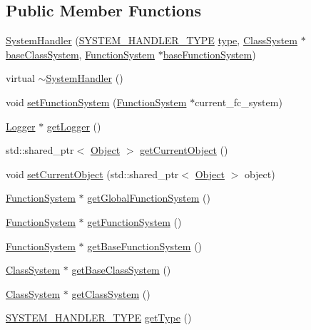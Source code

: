 \subsection*{Public Member Functions}
\begin{DoxyCompactItemize}
\item 
\hyperlink{classSystemHandler_abda0d6c76ea3eb8fa8e1493931e5d76b}{System\+Handler} (\hyperlink{statics_8h_a28f867553077bc713fdf8921a9226e2e}{S\+Y\+S\+T\+E\+M\+\_\+\+H\+A\+N\+D\+L\+E\+R\+\_\+\+T\+Y\+PE} \hyperlink{classSystemHandler_a8ca6090af683e8555051681fd31cd865}{type}, \hyperlink{classClassSystem}{Class\+System} $\ast$\hyperlink{classSystemHandler_ab54036ced60be518459b1c4753667912}{base\+Class\+System}, \hyperlink{classFunctionSystem}{Function\+System} $\ast$\hyperlink{classSystemHandler_af601707ec9f56e24be4c0541a1c760f4}{base\+Function\+System})
\item 
virtual \hyperlink{classSystemHandler_afd4662824fbf97d8feb248c346968102}{$\sim$\+System\+Handler} ()
\item 
void \hyperlink{classSystemHandler_af27b9410a75ac02dff13b045afdff038}{set\+Function\+System} (\hyperlink{classFunctionSystem}{Function\+System} $\ast$current\+\_\+fc\+\_\+system)
\item 
\hyperlink{classLogger}{Logger} $\ast$ \hyperlink{classSystemHandler_a2d30e2dd0efb6287ae14b36f1c6bb48b}{get\+Logger} ()
\item 
std\+::shared\+\_\+ptr$<$ \hyperlink{classObject}{Object} $>$ \hyperlink{classSystemHandler_aa2a7dad9232938a79b8a813b1238ee13}{get\+Current\+Object} ()
\item 
void \hyperlink{classSystemHandler_a2954779b7877d67d7207c4ea27194a0c}{set\+Current\+Object} (std\+::shared\+\_\+ptr$<$ \hyperlink{classObject}{Object} $>$ object)
\item 
\hyperlink{classFunctionSystem}{Function\+System} $\ast$ \hyperlink{classSystemHandler_a6622a7fa3c494ec657448d0d3f01eb3b}{get\+Global\+Function\+System} ()
\item 
\hyperlink{classFunctionSystem}{Function\+System} $\ast$ \hyperlink{classSystemHandler_a052dfd8bfff27ed9bf12fd84e066ecb3}{get\+Function\+System} ()
\item 
\hyperlink{classFunctionSystem}{Function\+System} $\ast$ \hyperlink{classSystemHandler_a2013db1f8788be4d7e3eb1da5320de45}{get\+Base\+Function\+System} ()
\item 
\hyperlink{classClassSystem}{Class\+System} $\ast$ \hyperlink{classSystemHandler_a2127b2f17952d52c457d40baa641b009}{get\+Base\+Class\+System} ()
\item 
\hyperlink{classClassSystem}{Class\+System} $\ast$ \hyperlink{classSystemHandler_a218066abe52952bf45c3ba21fdf86368}{get\+Class\+System} ()
\item 
\hyperlink{statics_8h_a28f867553077bc713fdf8921a9226e2e}{S\+Y\+S\+T\+E\+M\+\_\+\+H\+A\+N\+D\+L\+E\+R\+\_\+\+T\+Y\+PE} \hyperlink{classSystemHandler_a7d5df891633958f20c66e8046019bdcb}{get\+Type} ()
\end{DoxyCompactItemize}
